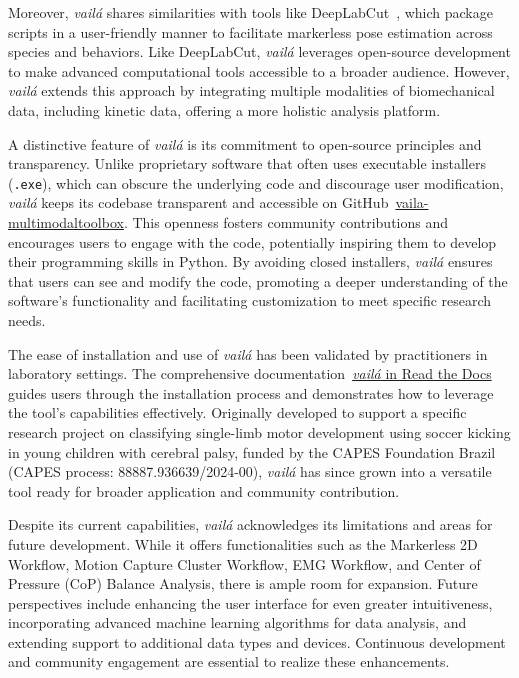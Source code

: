 \documentclass{article}
\begin{document}
Moreover, \textit{vailá} shares similarities with tools like DeepLabCut~\citep{nath2019using}, which package scripts in a user-friendly manner to facilitate markerless pose estimation across species and behaviors. Like DeepLabCut, \textit{vailá} leverages open-source development to make advanced computational tools accessible to a broader audience. However, \textit{vailá} extends this approach by integrating multiple modalities of biomechanical data, including kinetic data, offering a more holistic analysis platform.

A distinctive feature of \textit{vailá} is its commitment to open-source principles and transparency. Unlike proprietary software that often uses executable installers (\texttt{.exe}), which can obscure the underlying code and discourage user modification, \textit{vailá} keeps its codebase transparent and accessible on GitHub~\href{https://github.com/vaila-multimodaltoolbox/vaila}{vaila-multimodaltoolbox}. This openness fosters community contributions and encourages users to engage with the code, potentially inspiring them to develop their programming skills in Python. By avoiding closed installers, \textit{vailá} ensures that users can see and modify the code, promoting a deeper understanding of the software's functionality and facilitating customization to meet specific research needs.

The ease of installation and use of \textit{vailá} has been validated by practitioners in laboratory settings. The comprehensive documentation~\href{https://vaila.readthedocs.io/en/latest/}{\textit{vailá} in Read the Docs} guides users through the installation process and demonstrates how to leverage the tool's capabilities effectively. Originally developed to support a specific research project on classifying single-limb motor development using soccer kicking in young children with cerebral palsy, funded by the CAPES Foundation Brazil (CAPES process: 88887.936639/2024-00), \textit{vailá} has since grown into a versatile tool ready for broader application and community contribution.

Despite its current capabilities, \textit{vailá} acknowledges its limitations and areas for future development. While it offers functionalities such as the Markerless 2D Workflow, Motion Capture Cluster Workflow, EMG Workflow, and Center of Pressure (CoP) Balance Analysis, there is ample room for expansion. Future perspectives include enhancing the user interface for even greater intuitiveness, incorporating advanced machine learning algorithms for data analysis, and extending support to additional data types and devices. Continuous development and community engagement are essential to realize these enhancements.
\end{document}
